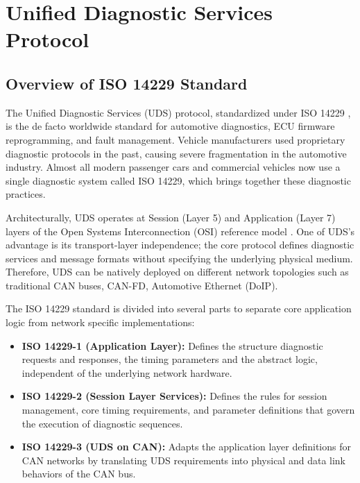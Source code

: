\chapter{Unified Diagnostic Services Protocol}\label{ch:uds_protocol}

\section{Overview of ISO 14229 Standard}\label{sec:uds_overview}

The Unified Diagnostic Services (\gls{UDS}) protocol, standardized under ISO 14229 \cite{iso14229_2020}, is the de facto worldwide standard for automotive diagnostics, ECU firmware reprogramming, and fault management. Vehicle manufacturers used proprietary diagnostic protocols in the past, causing severe fragmentation in the automotive industry.  Almost all modern passenger cars and commercial vehicles now use a single diagnostic system called ISO 14229, which brings together these diagnostic practices.

Architecturally, \gls{UDS} operates at Session (Layer 5) and Application (Layer 7) layers of the Open Systems Interconnection (OSI) reference model \cite{csselectronics_uds_protocol}. One of \gls{UDS}'s advantage is its transport-layer independence; the core protocol defines diagnostic services and message formats without specifying the underlying physical medium. Therefore, \gls{UDS} can be natively deployed on different network topologies such as traditional \gls{CAN} buses, \gls{CAN-FD}, Automotive Ethernet (DoIP).

The ISO 14229 standard is divided into several parts to separate core application logic from network specific implementations:
\begin{itemize}
    \item \textbf{ISO 14229\textnormal{-}1 (Application Layer):} Defines the structure diagnostic requests and responses, the timing parameters and the abstract logic, independent of the underlying network hardware.
    \item \textbf{ISO 14229\textnormal{-}2 (Session Layer Services):} Defines the rules for session management, core timing requirements, and parameter definitions that govern the execution of diagnostic sequences.
    \item \textbf{ISO 14229\textnormal{-}3 (UDS on CAN):} Adapts the application layer definitions for \gls{CAN} networks by translating \gls{UDS} requirements into physical and data link behaviors of the \gls{CAN} bus.
\end{itemize}

